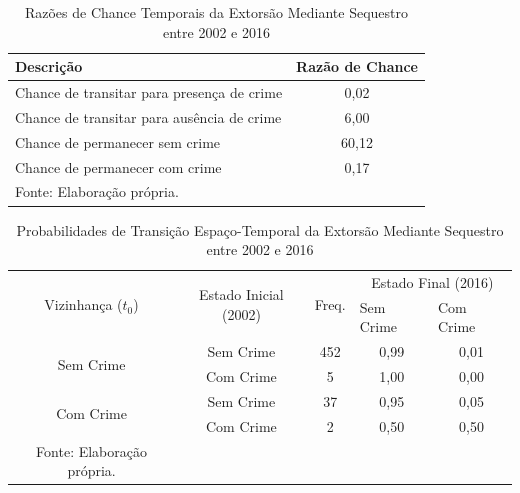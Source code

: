 \documentclass[12pt,openright,oneside,a4paper,english,french,spanish]{abntex2}
\numberwithin{table}{section} %
\numberwithin{figure}{section} %
\begin{document}
\begin{subappendices}
\begin{table}[H]
\centering
\caption{Razões de Chance Temporais da Extorsão Mediante Sequestro entre 2002 e 2016}
        \begin{tabular}{lc}
            \hline
            {\textbf{Descrição}} & {\textbf{Razão de Chance}} \\\hline
            {Chance de transitar para presença de crime} & {0,02} \\
            {Chance de transitar para ausência de crime} & {6,00} \\
            {Chance de permanecer sem crime} & {60,12} \\
            {Chance de permanecer com crime} & {0,17} \\\hline
            \tiny Fonte: Elaboração própria.
        \end{tabular}
    \label{tab:odds_tempo_extoMS_2002_2016}
\end{table}


\begin{table}[H]
\centering
\caption{Probabilidades de Transição Espaço-Temporal da Extorsão Mediante Sequestro entre 2002 e 2016}
        \begin{tabular}{ccccc}
            \hline
            \multirow{2}{*}{Vizinhança ($t_0$)} & \multirow{2}{*}{Estado Inicial (2002)} & \multirow{2}{*}{Freq.} & \multicolumn{2}{c}{Estado Final (2016)}  \\\cline{4-5} %
                                        & & & \multicolumn{1}{l}{Sem Crime} & \multicolumn{1}{l}{Com Crime} \\\hline
            \multirow{2}{*}{Sem Crime} & {Sem Crime} & 452 &  {0,99} & {0,01} \\
                                       & {Com Crime} & 5 &    {1,00} & {0,00} \\\hline
            \multirow{2}{*}{Com Crime} & {Sem Crime} & 37 &   {0,95} & {0,05} \\
                                       & {Com Crime} & 2 &    {0,50} & {0,50} \\\hline
            \tiny Fonte: Elaboração própria.
        \end{tabular}
    \label{tab:prob_espaco_tempo_extoMS_2002_2016}
\end{table}



\end{subappendices}
\end{document}
